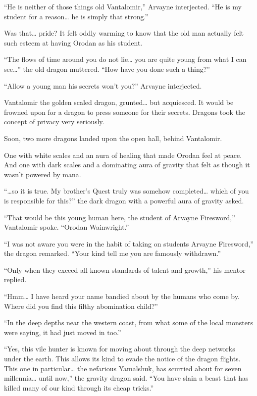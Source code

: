 \documentclass[a4paper,10pt]{book}
\begin{document}
“He is neither of those things old Vantalomir,” Arvayne interjected. “He is my student for a reason… he is simply that strong.”\par
Was that… pride? It felt oddly warming to know that the old man actually felt such esteem at having Orodan as his student.\par
“The flows of time around you do not lie… you are quite young from what I can see…” the old dragon muttered. “How have you done such a thing?”\par
“Allow a young man his secrets won’t you?” Arvayne interjected.\par
Vantalomir the golden scaled dragon, grunted… but acquiesced. It would be frowned upon for a dragon to press someone for their secrets. Dragons took the concept of privacy very seriously.\par
Soon, two more dragons landed upon the open hall, behind Vantalomir.\par
One with white scales and an aura of healing that made Orodan feel at peace. And one with dark scales and a dominating aura of gravity that felt as though it wasn’t powered by mana.\par
“…so it is true. My brother’s Quest truly was somehow completed… which of you is responsible for this?” the dark dragon with a powerful aura of gravity asked.\par
“That would be this young human here, the student of Arvayne Firesword,” Vantalomir spoke. “Orodan Wainwright.”\par
“I was not aware you were in the habit of taking on students Arvayne Firesword,” the dragon remarked. “Your kind tell me you are famously withdrawn.”\par
“Only when they exceed all known standards of talent and growth,” his mentor replied.\par
“Hmm… I have heard your name bandied about by the humans who come by. Where did you find this filthy abomination child?”\par
“In the deep depths near the western coast, from what some of the local monsters were saying, it had just moved in too.”\par
“Yes, this vile hunter is known for moving about through the deep networks under the earth. This allows its kind to evade the notice of the dragon flights. This one in particular… the nefarious Yamalshuk, has scurried about for seven millennia… until now,” the gravity dragon said. “You have slain a beast that has killed many of our kind through its cheap tricks.”\par
\end{document}
